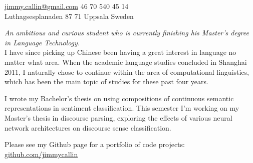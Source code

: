 \documentclass[10pt,a4paper]{article}
\begin{document}
\sloppy  %



\nobreakvspace{0.3em}  %

\noindent\href{mailto:jimmy.callin@gmail.com}{jimmy.callin@gmail.com}\sbull
\textsmaller{+}46 70 540 45 14
\\
Luthagsesplanaden 87 71\thinspace {\large}\sbull
Uppsala\sbull
Sweden

\spacedhrule{0.9em}{-0.4em}  %


\vspace{-1.3em}  %
\begin{multicols}{2}  %
\noindent \emph{An ambitious and curious student who is currently finishing his Master's degree in Language Technology.}
\\
I have since picking up Chinese been having a great interest in language no matter what area. When the academic language studies concluded in Shanghai 2011, I naturally chose to continue within the area of computational linguistics, which has been the main topic of studies for these past four years.

I wrote my Bachelor's thesis on using compositions of continuous semantic representations in sentiment classification. This semester I'm working on my Master's thesis in discourse parsing, exploring the effects of various neural network architectures on discourse sense classification.

Please see my Github page for a portfolio of code projects: \href{https://github.com/jimmycallin}{github.com/jimmycallin}
\end{multicols}


\spacedhrule{0em}{-0.4em}

\end{document}

